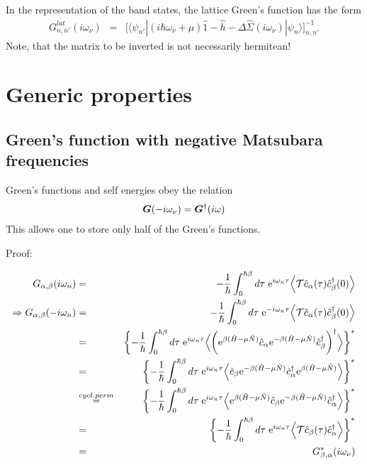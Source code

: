 \documentclass[11pt,a4paper]{report}
\begin{document}
In the representation of the band states, the lattice Green's function
has the form
\begin{eqnarray}
G^{lat}_{n,n'}(i\omega_\nu)&=&
\biggl[\langle\psi_{n'}|(i\hbar\omega_\nu+\mu)\hat{1}-\hat{h}
-\Delta\hat{\Sigma}(i\omega_\nu)|\psi_n\rangle\biggr]_{n,n'}^{-1}
\label{eq:latgreenfuncmat}
\end{eqnarray}
Note, that the matrix to be inverted is not necessarily hermitean!

\section{Generic properties}
\subsection{Green's function with negative Matsubara frequencies}
Green's functions and self energies obey the relation
\begin{eqnarray*}
\bm{G}(-i\omega_\nu)=\bm{G}^\dagger(i\omega)
\end{eqnarray*}
This allows one to store only half of the Green's functions.

Proof:

\begin{eqnarray}
G_{\alpha,\beta}(i\omega_n)&=&
-\frac{1}{\hbar}\int_0^{\hbar\beta} d\tau\;\mathrm{e}^{i\omega_n\tau}
\Bigl\langle\mathcal{T}\hat{c}_\alpha(\tau)\hat{c}^\dagger_\beta(0)\Bigr\rangle
\\
\Rightarrow
G_{\alpha,\beta}(-i\omega_n)
&=&
-\frac{1}{\hbar}\int_0^{\hbar\beta} d\tau\;\mathrm{e}^{-i\omega_n\tau}
\Bigl\langle\mathcal{T}\hat{c}_\alpha(\tau)\hat{c}^\dagger_\beta(0)\Bigr\rangle
\nonumber\\
&=&
\biggl\lbrace
-\frac{1}{\hbar}\int_0^{\hbar\beta} d\tau\;\mathrm{e}^{i\omega_n\tau}
\Bigl\langle\biggl(\mathrm{e}^{\beta(\hat{H}-\mu\hat{N})}\hat{c}_\alpha
\mathrm{e}^{-\beta(\hat{H}-\mu\hat{N})}\hat{c}^\dagger_\beta\biggr)^\dagger
\Bigr\rangle
\biggr\rbrace^*
\nonumber\\
&=&
\biggl\lbrace
-\frac{1}{\hbar}\int_0^{\hbar\beta} d\tau\;\mathrm{e}^{i\omega_n\tau}
\Bigl\langle
\hat{c}_\beta\mathrm{e}^{-\beta(\hat{H}-\mu\hat{N})}\hat{c}^\dagger_\alpha
\mathrm{e}^{\beta(\hat{H}-\mu\hat{N})}
\Bigr\rangle
\biggr\rbrace^*
\nonumber\\
&\stackrel{cycl. perm}{=}&
\biggl\lbrace
-\frac{1}{\hbar}\int_0^{\hbar\beta} d\tau\;\mathrm{e}^{i\omega_n\tau}
\Bigl\langle
\mathrm{e}^{\beta(\hat{H}-\mu\hat{N})}
\hat{c}_\beta\mathrm{e}^{-\beta(\hat{H}-\mu\hat{N})}\hat{c}^\dagger_\alpha
\Bigr\rangle
\biggr\rbrace^*
\nonumber\\
&=&
\biggl\lbrace
-\frac{1}{\hbar}\int_0^{\hbar\beta} d\tau\;\mathrm{e}^{i\omega_n\tau}
\Bigl\langle
\mathcal{T}\hat{c}_\beta(\tau)\hat{c}^\dagger_\alpha
\Bigr\rangle
\biggr\rbrace^*
\nonumber\\
&=&
G_{\beta,\alpha}^*(i\omega_\nu)
\end{eqnarray}
\end{document}
